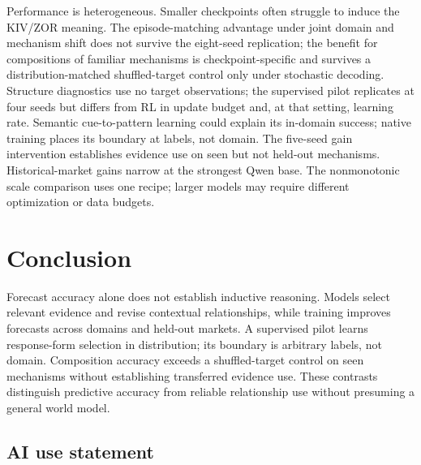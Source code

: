 \documentclass{article}
\begin{document}
Performance is heterogeneous. Smaller checkpoints often struggle to induce the
KIV/ZOR meaning. The episode-matching advantage under joint domain and mechanism
shift does not survive the eight-seed replication; the benefit for compositions
of familiar mechanisms is checkpoint-specific and survives a
distribution-matched shuffled-target control only under stochastic decoding. Structure diagnostics use no target
observations; the supervised pilot replicates at four seeds but differs from
RL in update budget and, at that setting, learning rate. Semantic cue-to-pattern
learning could explain its in-domain success; native training places its
boundary at labels, not domain. The five-seed gain intervention establishes
evidence use on seen but not held-out mechanisms.
Historical-market gains narrow at the strongest Qwen base. The nonmonotonic
scale comparison uses one recipe; larger models may require different
optimization or data budgets.
\section{Conclusion}
\label{sec:conclusion}

Forecast accuracy alone does not establish inductive reasoning. Models select
relevant evidence and revise contextual relationships, while training improves
forecasts across domains and held-out markets. A supervised pilot learns
response-form selection in distribution; its boundary is arbitrary labels, not
domain. Composition accuracy exceeds a shuffled-target control on seen
mechanisms without establishing transferred evidence use. These contrasts distinguish predictive accuracy from
reliable relationship use without presuming a general world model.
\subsection*{AI use statement}
\end{document}
